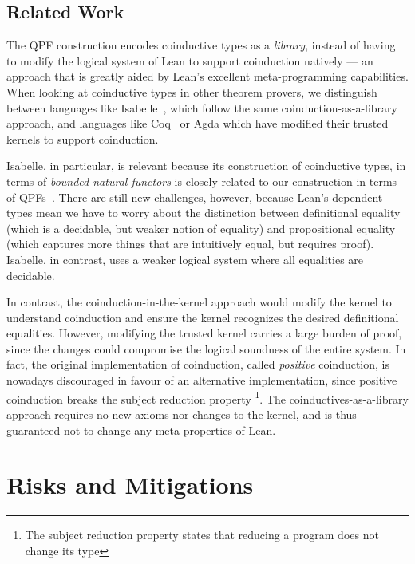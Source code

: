 \documentclass[a4paper]{scrartcl}
\begin{document}
\subsection{Related Work}\label{related-work-1}

The QPF construction encodes coinductive types as a \emph{library},
instead of having to modify the logical system of Lean to support
coinduction natively --- an approach that is greatly aided by Lean's
excellent meta-programming capabilities. When looking at coinductive
types in other theorem provers, we distinguish between languages like
Isabelle~\cite{traytelCategoryTheoryBased}, which follow the same
coinduction-as-a-library approach, and languages like Coq~\cite{gimenezTutorialRecursiveTypes1998, gimenezApplicationCoinductiveTypes1996}
or Agda which have modified their trusted kernels to support
coinduction.

Isabelle, in particular, is relevant because its construction of
coinductive types, in terms of \emph{bounded natural functors} is
closely related to our construction in terms of QPFs~\cite{furerQuotientsBoundedNatural2022}. There are still new
challenges, however, because Lean's dependent types mean we have to
worry about the distinction between definitional equality (which is a
decidable, but weaker notion of equality) and propositional equality
(which captures more things that are intuitively equal, but requires
proof). Isabelle, in contrast, uses a weaker logical system where all
equalities are decidable.

In contrast, the coinduction-in-the-kernel approach would modify the
kernel to understand coinduction and ensure the kernel recognizes the
desired definitional equalities. However, modifying the trusted kernel
carries a large burden of proof, since the changes could compromise the
logical soundness of the entire system. In fact, the original
implementation of coinduction, called \emph{positive} coinduction, is
nowadays discouraged in favour of an alternative implementation, since
positive coinduction breaks the subject reduction property
\footnote{The subject reduction property states that reducing a program
  does not change its type}\cite{sozeauCorrectCompleteType}. The
coinductives-as-a-library approach requires no new axioms nor changes to
the kernel, and is thus guaranteed not to change any meta properties of
Lean.

\section{Risks and Mitigations}
\end{document}
